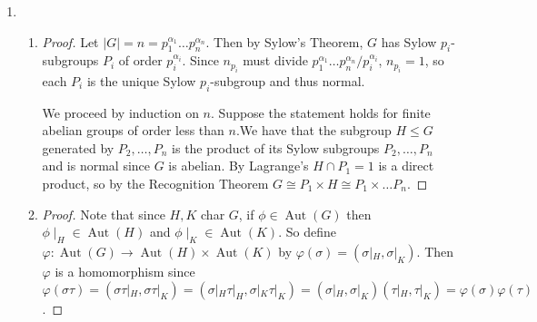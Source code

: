\documentclass[11pt, letterpaper]{article}
\begin{document}
\begin{enumerate}
\begin{enumerate}
    so $yxy^{-1} \in \coprod G_i$, and by the subgroup criterion, $\coprod G_i \leq \prod G_i$.

    \item \begin{proof}
      Let $x \in T(\prod G)$. Then $\vert x \vert = n < \infty$. If $x = (x_1, x_2, \dots)$ had infinitely many non-identity components, then its order would be infinite, since one could always choose a prime $p > n$ such that $x_i \in Z_p$ such that $x_i^n \neq 1$. So all but finitely many components of $x$ are the identity, so $x \in \coprod G$. Conversely, if $x \in \coprod G$, then there are finitely many non-identity components each in some cyclic group $Z_{p_1}, \dots, Z_{p_n}$. Then $\vert x \vert \leq p_1 \dots p_n < \infty$, so $x \in T(\prod G)$.
    \end{proof} 
  \end{enumerate}

  \item \begin{enumerate}
    \item \begin{proof}
      Let $\vert G \vert = n = p_1^{\alpha_1} \dots p_n^{\alpha_n}$. Then by Sylow's Theorem, $G$ has Sylow $p_i$-subgroups $P_i$ of order $p_i^{\alpha_i}$. Since $n_{p_i}$ must divide $p_1^{\alpha_1} \dots p_n^{\alpha_n}/p_i^{\alpha_i}$, $n_{p_i} = 1$, so each $P_i$ is the unique Sylow $p_i$-subgroup and thus normal.
      
      We proceed by induction on $n$. Suppose the statement holds for finite abelian groups of order less than $n$.We have that the subgroup $H \leq G$ generated by $P_2, \dots, P_n$ is the product of its Sylow subgroups $P_2, \dots, P_n$ and is normal since $G$ is abelian. By Lagrange's $H \cap P_1 = 1$ is a direct product, so by the Recognition Theorem $G \cong P_1 \times H \cong P_1 \times \dots P_n$.
    \end{proof}

    \item \begin{proof}
      Note that since $H, K$ char $G$, if $\phi \in \operatorname{Aut}(G)$ then $\phi \mid_H \in \operatorname{Aut}(H)$ and $\phi \mid_K \in \operatorname{Aut}(K)$. So define $\varphi: \operatorname{Aut}(G) \to \operatorname{Aut}(H) \times \operatorname{Aut}(K)$ by $\varphi(\sigma) = (\sigma|_H, \sigma|_K)$. Then $\varphi$ is a homomorphism since $\varphi(\sigma \tau) = (\sigma \tau|_H, \sigma \tau|_K) = (\sigma|_H \tau|_H, \sigma|_K \tau|_K) = (\sigma|_H, \sigma|_K)(\tau|_H, \tau|_K) = \varphi(\sigma) \varphi(\tau)$. 


\end{proof}
\end{enumerate}
\end{enumerate}
\end{document}
